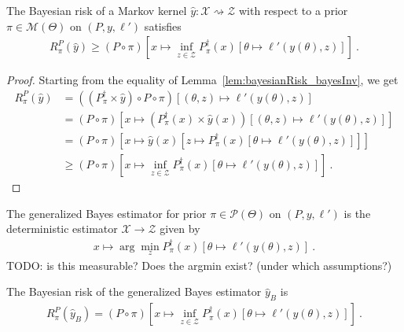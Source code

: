 \begin{lemma}
  \label{lem:bayesianRisk_ge_inf_bayesInv}
  \leanok
  The Bayesian risk of a Markov kernel $\hat{y} : \mathcal X \rightsquigarrow \mathcal Z$ with respect to a prior $\pi \in \mathcal M(\Theta)$ on $(P, y, \ell')$ satisfies
  \begin{align*}
  R^P_\pi(\hat{y}) \ge (P \circ \pi)\left[x \mapsto \inf_{z \in \mathcal Z} P_\pi^\dagger(x) \left[\theta \mapsto \ell'(y(\theta), z)\right]\right] \: .
  \end{align*}
\end{lemma}

\begin{proof}\leanok
{}
Starting from the equality of Lemma~\ref{lem:bayesianRisk_bayesInv}, we get
\begin{align*}
R^P_\pi(\hat{y})
&= ((P_\pi^\dagger \times \hat{y}) \circ P \circ \pi)\left[(\theta, z) \mapsto \ell'(y(\theta), z)\right]
\\
&= (P \circ \pi)\left[x \mapsto (P_\pi^\dagger(x) \times \hat{y}(x)) \left[(\theta, z) \mapsto \ell'(y(\theta), z)\right]\right]
\\
&= (P \circ \pi)\left[x \mapsto \hat{y}(x)\left[z \mapsto P_\pi^\dagger(x) \left[\theta \mapsto \ell'(y(\theta), z)\right]\right]\right]
\\
&\ge (P \circ \pi)\left[x \mapsto \inf_{z \in \mathcal Z} P_\pi^\dagger(x) \left[\theta \mapsto \ell'(y(\theta), z)\right]\right]
\: .
\end{align*}

\end{proof}

\begin{definition}
  \label{def:genBayesEstimator}
  The generalized Bayes estimator for prior $\pi \in \mathcal P(\Theta)$ on $(P, y, \ell')$ is the deterministic estimator $\mathcal X \to \mathcal Z$ given by
  \begin{align*}
  x \mapsto \arg\min_z P_\pi^\dagger(x)\left[\theta \mapsto \ell'(y(\theta), z)\right] \: .
  \end{align*}
  TODO: is this measurable? Does the argmin exist? (under which assumptions?)
\end{definition}

\begin{lemma}
  \label{lem:bayesianRisk_genBayesEstimator}
  The Bayesian risk of the generalized Bayes estimator $\hat{y}_B$ is
  \begin{align*}
  R^P_\pi(\hat{y}_B) = (P \circ \pi)\left[x \mapsto \inf_{z \in \mathcal Z} P_\pi^\dagger(x) \left[\theta \mapsto \ell'(y(\theta), z)\right]\right]
  \: .
  \end{align*}
\end{lemma}

